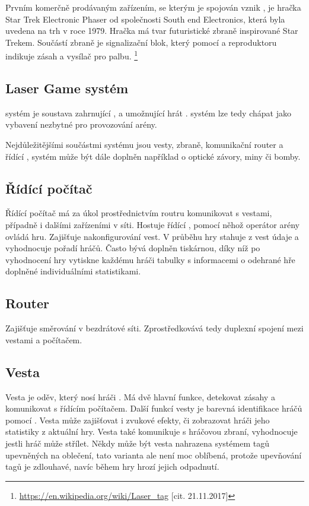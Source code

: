 Prvním komerčně prodávaným zařízením, se kterým je spojován vznik , je hračka Star Trek Electronic Phaser od společnosti South end Electronics, která byla uvedena na trh v roce 1979. Hračka má tvar futuristické zbraně inspirované Star Trekem. Součástí zbraně je signalizační blok, který pomocí  a reproduktoru indikuje zásah a  vysílač pro palbu.
\footnote{\url{https://en.wikipedia.org/wiki/Laser_tag} [cit. 21.11.2017]}

\subsection{Laser Game systém}
 systém je soustava zahrnující ,  a  umožnující hrát .  systém lze tedy chápat jako vybavení nezbytné pro provozování  arény.

Nejdůležitějšími součástmi  systému jsou vesty, zbraně, komunikační router a řídící ,  systém může být dále doplněn například o optické závory, miny či bomby.

\subsection{Řídící počítač}
Řídící počítač má za úkol prostřednictvím routru komunikovat s vestami, případně i dalšími zařízeními v síti. Hostuje řídící , pomocí něhož operátor arény ovládá hru. Zajišťuje nakonfigurování vest. V průběhu hry stahuje z vest údaje a vyhodnocuje pořadí hráčů. Často bývá doplněn tiskárnou, díky níž po vyhodnocení hry vytiskne každému hráči tabulky s informacemi o odehrané hře doplněné individuálními statistikami.

\subsection{Router}
Zajišťuje směrování v bezdrátové  síti. Zprostředkovává tedy duplexní spojení mezi vestami a počítačem.

\subsection{Vesta}
Vesta je oděv, který nosí hráči . Má dvě hlavní funkce, detekovat zásahy a komunikovat s řídícím počítačem. Další funkcí vesty je barevná identifikace hráčů pomocí  . Vesta může zajišťovat i zvukové efekty, či zobrazovat hráči jeho statistiky z aktuální hry. Vesta také komunikuje s hráčovou zbraní, vyhodnocuje jestli hráč může střílet. Někdy může být vesta nahrazena systémem tagů upevněných na oblečení, tato varianta ale není moc oblíbená, protože upevňování tagů je zdlouhavé, navíc během hry hrozí jejich odpadnutí.


